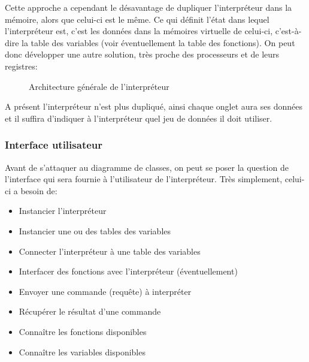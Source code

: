 \documentclass[french]{article}
\begin{document}
			Cette approche a cependant le désavantage de dupliquer l'interpréteur dans la mémoire, alors que celui-ci est le même. Ce qui définit l'état dans lequel l'interpréteur est, c'est les données dans la mémoires virtuelle de celui-ci, c'est-à-dire la table des variables (voir éventuellement la table des fonctions). On peut donc développer une autre solution, très proche des processeurs et de leurs registres:
			
			\begin{figure}[H]
				\centering
				\caption{Architecture générale de l'interpréteur}
			\end{figure}
			
			A présent l'interpréteur n'est plus dupliqué, ainsi chaque onglet aura ses données et il suffira d'indiquer à l'interpréteur quel jeu de données il doit utiliser.
			
			\subsubsection{Interface utilisateur}
				Avant de s'attaquer au diagramme de classes, on peut se poser la question de l'interface qui sera fournie à l'utilisateur de l'interpréteur. Très simplement, celui-ci a besoin de:
				
				\begin{itemize}
					\item Instancier l'interpréteur
					\item Instancier une ou des tables des variables
					\item Connecter l'interpréteur à une table des variables
					\item Interfacer des fonctions avec l'interpréteur (éventuellement)
					\item Envoyer une commande (requête) à interpréter
					\item Récupérer le résultat d'une commande
					\item Connaître les fonctions disponibles
					\item Connaître les variables disponibles
				\end{itemize}
				
\end{document}
